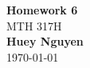 \begin{titlepage}
    \begin{center}
    {\fontsize{40}{48}\selectfont \bfseries Homework 6} 
    \\\vspace{20pt}
    {\LARGE MTH 317H} \\
    \vspace{20pt}
    \textbf{Huey Nguyen}
    \vspace{8pt}
    \\\today
    \end{center}
\end{titlepage}